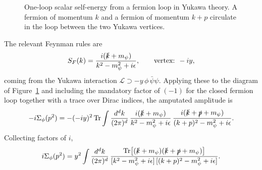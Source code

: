 \documentclass[a4paper, 11pt]{article}
\begin{document}
\begin{figure}[H]
    \centering
    \caption{One-loop scalar self-energy from a fermion loop in Yukawa theory. A fermion of momentum $k$ and a fermion of momentum $k+p$ circulate in the loop between the two Yukawa vertices.}
    \label{fig:scalar_selfenergy}
\end{figure}

\noindent The relevant Feynman rules are
\begin{equation*}
    S_F(k) = \frac{i(\slashed{k}+m_\psi)}{k^2-m_\psi^2+i\epsilon}, \qquad
    \text{vertex: } -iy,
\end{equation*}
coming from the Yukawa interaction $\mathcal{L}\supset -y\,\phi\,\bar\psi\psi$. Applying these to the diagram of Figure~\ref{fig:scalar_selfenergy} and including the mandatory factor of $(-1)$ for the closed fermion loop together with a trace over Dirac indices, the amputated amplitude is
\begin{equation*}
    -i\Sigma_\phi(p^2) = -(-iy)^2\,\mathrm{Tr}\int\frac{d^dk}{(2\pi)^d}\,
    \frac{i(\slashed{k}+m_\psi)}{k^2-m_\psi^2+i\epsilon}\,
    \frac{i(\slashed{k}+\slashed{p}+m_\psi)}{(k+p)^2-m_\psi^2+i\epsilon}.
\end{equation*}
Collecting factors of $i$,
\begin{equation}
    i\Sigma_\phi(p^2) = y^2\int\frac{d^dk}{(2\pi)^d}\,
    \frac{\mathrm{Tr}\big[(\slashed{k}+m_\psi)(\slashed{k}+\slashed{p}+m_\psi)\big]}
    {[k^2-m_\psi^2+i\epsilon]\,[(k+p)^2-m_\psi^2+i\epsilon]}.
    \label{eq:SigmaPhi_raw}
\end{equation}
\end{document}
